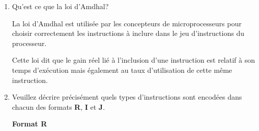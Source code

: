 {\begin{enumerate}
    \begin{correction}

      \textbf{CISC}

      \begin{itemize}
	\item
	  Jeu d'instructions complexe pour coller aux exigences des
	  langages de haut niveau.
	\item
	  Microprocesseur plus complexe car les instructions le sont.
      \end{itemize}

      \textbf{RISC}

      \begin{itemize}
	\item
	  Jeu d'instructions tr\`es simple.
	\item
	  Microprocesseur tr\`es simple.
	\item
	  Processeur essentiellement compos\'e de registres.
	\item
	  Les instructions registre-\`a-registre composent largement le
	  processeur. Les instructions d'acc\`es m\'emoire sont isol\'ees du
	  reste des instructions.
	\item
	  Les processeurs RISC ont la caract\'eristique d'ex\'ecuter chaque
	  instruction en un cycle.
      \end{itemize}

    \end{correction}
  \item
    Qu'est ce que la loi d'Amdhal?

    \begin{correction}

      La loi d'Amdhal est utilis\'ee par les concepteurs de microprocesseurs
      pour choisir correctement les instructions \`a inclure dans le
      jeu d'instructions du processeur.

      Cette loi dit que le gain r\'eel li\'e \`a l'inclusion d'une instruction
      est relatif \`a son temps d'ex\'ecution mais \'egalement au
      taux d'utilisation de cette m\^eme instruction.

    \end{correction}
  \item
    Veuillez d\'ecrire pr\'ecis\'ement quels types d'instructions sont
    encod\'ees dans chacun des formats \textbf{R}, \textbf{I} et \textbf{J}.

    \begin{correction}

      \textbf{Format R}


\end{correction}
\end{enumerate}}
